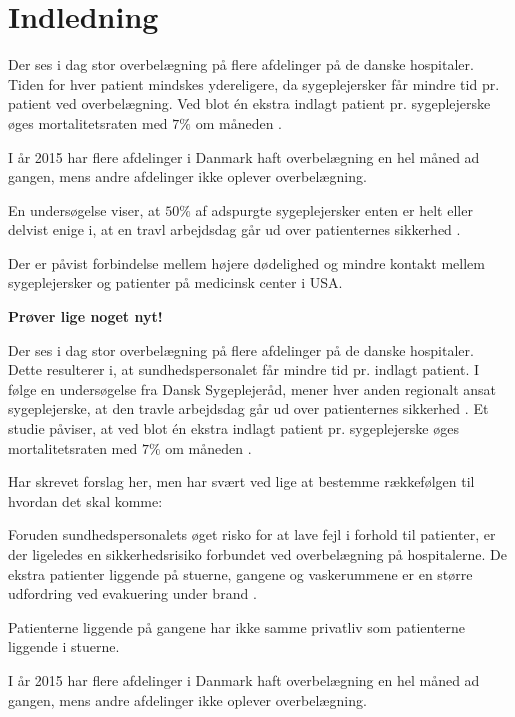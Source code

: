 \chapter{Indledning}
Der ses i dag stor overbelægning på flere afdelinger på de danske hospitaler. Tiden for hver patient mindskes ydereligere, da sygeplejersker får mindre tid pr. patient ved overbelægning.\cite{SDS2015} Ved blot én ekstra indlagt patient pr. sygeplejerske øges mortalitetsraten med $7 \%$ om måneden \cite{Aiken2014}.


I år 2015 har flere afdelinger i Danmark haft overbelægning en hel måned ad gangen, mens andre afdelinger ikke oplever overbelægning.\cite{SDS2015}


  En undersøgelse viser, at $50 \%$ af adspurgte sygeplejersker enten er helt eller delvist enige i, at en travl arbejdsdag går ud over patienternes sikkerhed \cite{Kjeldsen2015}.

 Der er påvist forbindelse mellem højere dødelighed og mindre kontakt mellem sygeplejersker og patienter på medicinsk center i USA.\cite{Madsen2014}



\textbf{Prøver lige noget nyt!}

Der ses i dag stor overbelægning på flere afdelinger på de danske hospitaler. Dette resulterer i, at sundhedspersonalet får mindre tid pr. indlagt patient. I følge en undersøgelse fra Dansk Sygeplejeråd, mener hver anden regionalt ansat sygeplejerske, at den travle arbejdsdag går ud over patienternes sikkerhed \cite{Kjeldsen2015}. Et studie påviser, at ved blot én ekstra indlagt patient pr. sygeplejerske øges mortalitetsraten med $7 \%$ om måneden  \cite{Aiken2014}. 


Har skrevet forslag her, men har svært ved lige at bestemme rækkefølgen til hvordan det skal komme:

Foruden sundhedspersonalets øget risko for at lave fejl i forhold til patienter, er der ligeledes en sikkerhedsrisiko forbundet ved overbelægning på hospitalerne. De ekstra patienter liggende på stuerne, gangene og vaskerummene er en større udfordring ved evakuering under brand \citep{Madsen2014}. 

Patienterne liggende på gangene har ikke samme privatliv som patienterne liggende i stuerne.\cite{Madsen2014}

I år 2015 har flere afdelinger i Danmark haft overbelægning en hel måned ad gangen, mens andre afdelinger ikke oplever overbelægning.\cite{2015}
